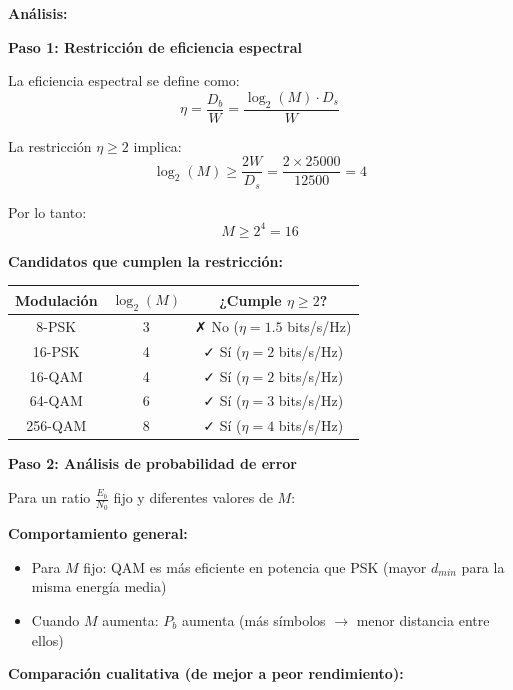 \documentclass[11pt,a4paper]{article}
\begin{document}
\textbf{An\'alisis:}

\textbf{Paso 1: Restricci\'on de eficiencia espectral}

La eficiencia espectral se define como:
\[
\eta = \frac{D_b}{W} = \frac{\log_2(M) \cdot D_s}{W}
\]

La restricci\'on $\eta \geq 2$ implica:
\[
\log_2(M) \geq \frac{2W}{D_s} = \frac{2 \times 25000}{12500} = 4
\]

Por lo tanto:
\[
M \geq 2^4 = 16
\]

\textbf{Candidatos que cumplen la restricci\'on:}

\begin{center}
\begin{tabular}{|c|c|c|}
\hline
\textbf{Modulaci\'on} & \textbf{$\log_2(M)$} & \textbf{¿Cumple $\eta \geq 2$?} \\
\hline
8-PSK & 3 & ✗ No ($\eta = 1.5$ bits/s/Hz) \\
16-PSK & 4 & ✓ S\'i ($\eta = 2$ bits/s/Hz) \\
16-QAM & 4 & ✓ S\'i ($\eta = 2$ bits/s/Hz) \\
64-QAM & 6 & ✓ S\'i ($\eta = 3$ bits/s/Hz) \\
256-QAM & 8 & ✓ S\'i ($\eta = 4$ bits/s/Hz) \\
\hline
\end{tabular}
\end{center}

\textbf{Paso 2: An\'alisis de probabilidad de error}

Para un ratio $\frac{E_b}{N_0}$ fijo y diferentes valores de $M$:

\textbf{Comportamiento general:}
\begin{itemize}
    \item Para $M$ fijo: QAM es m\'as eficiente en potencia que PSK (mayor $d_{min}$ para la misma energ\'ia media)
    
    \item Cuando $M$ aumenta: $P_b$ aumenta (m\'as s\'imbolos $\to$ menor distancia entre ellos)
\end{itemize}

\textbf{Comparaci\'on cualitativa (de mejor a peor rendimiento):}
\end{document}
